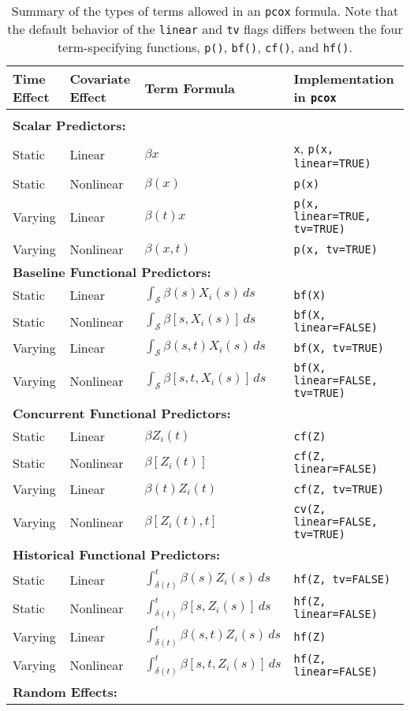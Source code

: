 \documentclass[12pt]{article}
\begin{document}
\begin{table}[t]
\centering
\caption{Summary of the types of terms allowed in an \texttt{pcox} formula. Note that the default behavior
of the \texttt{linear} and \texttt{tv} flags differs between the four term-specifying functions, \texttt{p()}, 
\texttt{bf()}, \texttt{cf()}, and \texttt{hf()}. \label{tab:terms}}
\begin{tabular}{llll}
\bf Time Effect & \bf Covariate Effect & \bf Term Formula & \bf Implementation in \texttt{pcox}  \\[1ex]
\hline \\[-1.5ex]
\multicolumn{4}{l}{\bf Scalar Predictors:} \\
Static	& Linear		& $\beta x$	& \texttt{x}, \texttt{p(x, linear=TRUE)} \\
Static	& Nonlinear	& $\beta(x)$	& \texttt{p(x)} \\
Varying	& Linear		& $\beta(t) x$	& \texttt{p(x, linear=TRUE, tv=TRUE)} \\
Varying	& Nonlinear	& $\beta(x,t)$	& \texttt{p(x, tv=TRUE)} \\[2ex]
\multicolumn{4}{l}{\bf Baseline Functional Predictors:} \\
Static	& Linear		& $\int_{\mathcal{S}} \beta(s)X_i(s)\,ds$	& \texttt{bf(X)} \\
Static	& Nonlinear	& $\int_{\mathcal{S}} \beta[s,X_i(s)]\,ds$	& \texttt{bf(X, linear=FALSE)}\\
Varying	& Linear		& $\int_{\mathcal{S}} \beta(s,t)X_i(s)\,ds$	& \texttt{bf(X, tv=TRUE)} \\
Varying	& Nonlinear	& $\int_{\mathcal{S}} \beta[s,t,X_i(s)]\, ds$	& \texttt{bf(X, linear=FALSE, tv=TRUE)} \\[2ex]
\multicolumn{4}{l}{\bf Concurrent Functional Predictors:} \\
Static	& Linear		& $\beta Z_i(t)$		& \texttt{cf(Z)}  \\
Static	& Nonlinear	& $\beta[Z_i(t)]$		& \texttt{cf(Z, linear=FALSE)} \\
Varying	& Linear		& $\beta(t) Z_i(t)$		& \texttt{cf(Z, tv=TRUE)} \\
Varying	& Nonlinear	& $\beta[Z_i(t), t]$		& \texttt{cv(Z, linear=FALSE, tv=TRUE)}\\[2ex]
\multicolumn{4}{l}{\bf Historical Functional Predictors:} \\
Static	& Linear		& $\int_{\delta(t)}^t \beta(s)Z_i(s)\,ds$	& \texttt{hf(Z, tv=FALSE)} \\
Static	& Nonlinear	& $\int_{\delta(t)}^t \beta[s, Z_i(s)]\,ds$	& \texttt{hf(Z, linear=FALSE)} \\
Varying	& Linear		& $\int_{\delta(t)}^t \beta(s,t)Z_i(s)\,ds$	& \texttt{hf(Z)} \\
Varying	& Nonlinear	& $\int_{\delta(t)}^t \beta[s, t, Z_i(s)]\,ds$	& \texttt{hf(Z, linear=FALSE)} \\[2ex]
\multicolumn{4}{l}{\bf Random Effects:} \\
\end{tabular}
\end{table}
\end{document}
